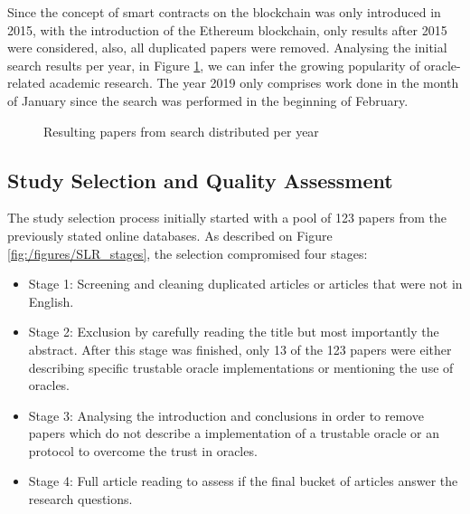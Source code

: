 Since the concept of smart contracts on the blockchain was only introduced in 2015, with the introduction of the Ethereum blockchain, only results after 2015 were considered, also, all duplicated papers were removed. Analysing the initial search results per year, in Figure \ref{search-results-per-year}, we can infer the growing popularity of oracle-related academic research. The year 2019 only comprises work done in the month of January since the search was performed in the beginning of February. 

\begin{figure}[H]
\centering
{}
\caption{Resulting papers from search distributed per year}
\label{search-results-per-year}
\end{figure}


\subsection{Study Selection and Quality Assessment}

The study selection process initially started with a pool of 123 papers from the previously stated online databases. As described on Figure \ref{fig:/figures/SLR_stages}, the selection compromised four stages:
\begin{itemize}
\item Stage 1: Screening and cleaning duplicated articles or articles that were not in English.
\item Stage 2: Exclusion by carefully reading the title but most importantly the abstract. After this stage was finished, only 13 of the 123 papers were either describing specific trustable oracle implementations or mentioning the use of oracles.
\item Stage 3: Analysing the introduction and conclusions in order to remove papers which do not describe a implementation of a trustable oracle or an protocol to overcome the trust in oracles.
\item Stage 4: Full article reading to assess if the final bucket of articles answer the research questions.
\end{itemize} 


